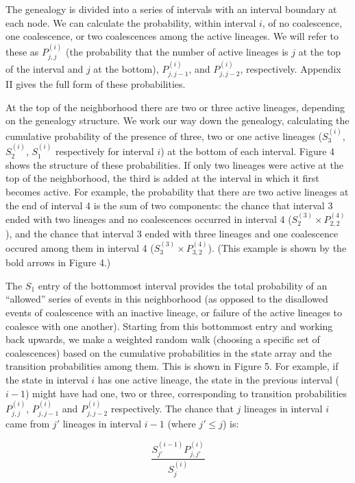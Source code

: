 \documentclass[12pt]{article}
\begin{document}
The genealogy is divided into a series of intervals with an interval boundary
at each node.
We can calculate the probability, within interval $i$,
of no coalescence, one coalescence, or two coalescences among the active
lineages.  We will refer to these as $P^{(i)}_{j,j}$ (the probability
that the number of active lineages is $j$ at the top of the interval and
$j$ at the bottom), $P^{(i)}_{j,j-1}$, and  $P^{(i)}_{j,j-2}$, respectively.  
Appendix II gives the full form of these probabilities.

At the top of the neighborhood there are two or three active lineages,
depending on the genealogy structure.  We work our way down the
genealogy, calculating the cumulative probability of
the presence of three, two or one active lineages ($S^{(i)}_{3}$,
$S^{(i)}_{2}$, $S^{(i)}_{1}$ respectively for interval $i$) at the
bottom of each interval.  Figure 4 shows
the structure of these probabilities.
If only two lineages were active at the top of the neighborhood, the third
is added at the interval in which it first becomes active.
For example, the probability that there are two active lineages at the
end of interval 4 is the sum of two components:  the chance that interval 3 ended
with two lineages and no coalescences occurred in interval 4
($S^{(3)}_{2} \times P^{(4)}_{2,2}$), and the
chance that interval 3 ended with three lineages and one coalescence occured
among them in interval 4 ($S^{(3)}_{3} \times P^{(4)}_{3,2}$).  (This example is shown
by the bold arrows in Figure 4.)

  The $S_{1}$ entry of
the bottommost interval 
provides the total probability of an ``allowed'' series of events
in this neighborhood (as opposed to the disallowed events of coalescence
with an inactive lineage, or failure of the active lineages to coalesce
with one another).
Starting from this bottommost entry and working back upwards, we make a
weighted random walk (choosing a 
specific set of coalescences) based on the cumulative probabilities in the
state array and the transition probabilities among them.  This is shown
in Figure 5.  For example,
if the state in interval $i$ has one active lineage,
the state in the previous interval ($i-1$) might have had one, two or three,
corresponding to transition probabilities $P^{(i)}_{j,j}$, $P^{(i)}_{j,j-1}$ 
and $P^{(i)}_{j,j-2}$ respectively.
The chance that $j$ lineages in interval $i$ came from $j'$ lineages in
interval $i-1$ (where $j' \leq j$) is:

\begin{equation}
\frac{S^{(i-1)}_{j'}P^{(i)}_{j,j'}}{S^{(i)}_{j}}
\end{equation}
\end{document}
